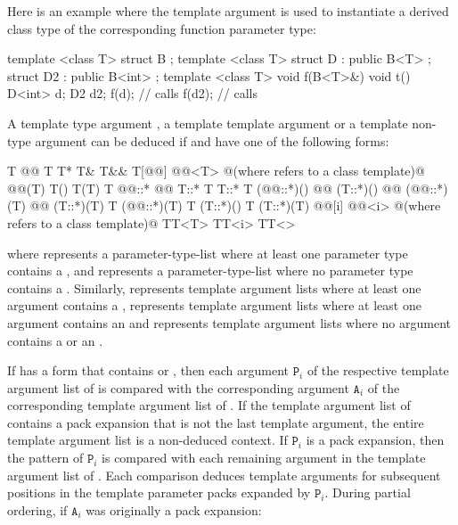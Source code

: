 \begin{example}
Here is an example where the template argument is used to instantiate
a derived class type of the corresponding function parameter type:

\begin{codeblock}
template <class T> struct B { };
template <class T> struct D : public B<T> {};
struct D2 : public B<int> {};
template <class T> void f(B<T>&){}
void t() {
  D<int> d;
  D2     d2;
  f(d);             // calls 
  f(d2);            // calls 
}
\end{codeblock}
\end{example}

\pnum
A template type argument
,
a template template argument
or a template non-type argument
can be deduced if
and
have one of the following forms:

\begin{codeblock}
T
@\cv{}@ T
T*
T&
T&&
T[@@]
@@<T>  @\textrm{(where  refers to a class template)}@
@@(T)
T()
T(T)
T @@::*
@@ T::*
T T::*
T (@@::*)()
@@ (T::*)()
@@ (@@::*)(T)
@@ (T::*)(T)
T (@@::*)(T)
T (T::*)()
T (T::*)(T)
@@[i]
@@<i>  @\textrm{(where  refers to a class template)}@
TT<T>
TT<i>
TT<>
\end{codeblock}

where
represents
a parameter-type-list
where at least one parameter type contains a
,
and
\tcode{()}
represents
a parameter-type-list
where no parameter type contains a
.
Similarly,
represents template argument lists where at least one argument contains a
,
represents template argument lists where at least one argument contains an
and
\tcode{<>}
represents template argument lists where no argument contains a
or an
.

\pnum
If  has a form that contains 
or , then each argument $\mathtt{P}_i$ of the
respective template argument list of  is compared with the
corresponding argument $\mathtt{A}_i$ of the corresponding
template argument list of . If the template argument list
of  contains a pack expansion that is not the last
template argument, the entire template argument list is a non-deduced
context. If $\texttt{P}_i$ is a pack expansion, then the pattern
of $\texttt{P}_i$ is compared with each remaining argument in the
template argument list of . Each comparison deduces
template arguments for subsequent positions in the template parameter
packs expanded by $\texttt{P}_i$.
During partial ordering, if $\texttt{A}_i$ was
originally a pack expansion:

